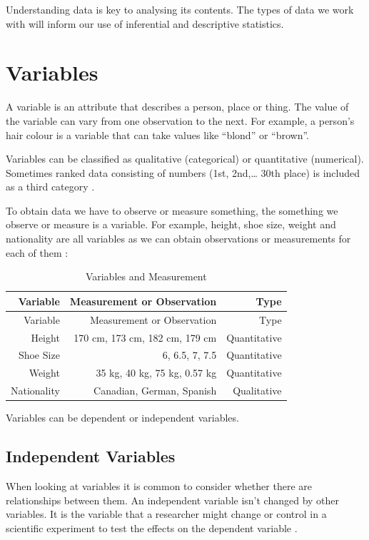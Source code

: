 \documentclass[
]{book}
\begin{document}
Understanding data is key to analysing its contents. The types of data we work with will inform our use of inferential and descriptive statistics.

\hypertarget{variables}{%
\section{Variables}\label{variables}}

A variable is an attribute that describes a person, place or thing. The value of the variable can vary from one observation to the next. For example, a person's hair colour is a variable that can take values like ``blond'' or ``brown''.

Variables can be classified as qualitative (categorical) or quantitative (numerical). Sometimes ranked data consisting of numbers (1st, 2nd,\ldots{} 30th place) is included as a third category \citep{Witte2017}.

To obtain data we have to observe or measure something, the something we observe or measure is a variable. For example, height, shoe size, weight and nationality are all variables as we can obtain observations or measurements for each of them \citep{Campbell2021}:

\begin{longtable}[]{@{}rrr@{}}
\caption{\label{tab:table000} Variables and Measurement}\tabularnewline
\toprule
Variable & Measurement or Observation & Type \\
\midrule
\endfirsthead
\toprule
Variable & Measurement or Observation & Type \\
\midrule
\endhead
Height & 170 cm, 173 cm, 182 cm, 179 cm & Quantitative \\
Shoe Size & 6, 6.5, 7, 7.5 & Quantitative \\
Weight & 35 kg, 40 kg, 75 kg, 0.57 kg & Quantitative \\
Nationality & Canadian, German, Spanish & Qualitative \\
\bottomrule
\end{longtable}

Variables can be dependent or independent variables.

\hypertarget{independent-variables}{%
\subsection{Independent Variables}\label{independent-variables}}

When looking at variables it is common to consider whether there are relationships between them. An independent variable isn't changed by other variables. It is the variable that a researcher might change or control in a scientific experiment to test the effects on the dependent variable \citep{Witte2017}.
\end{document}
